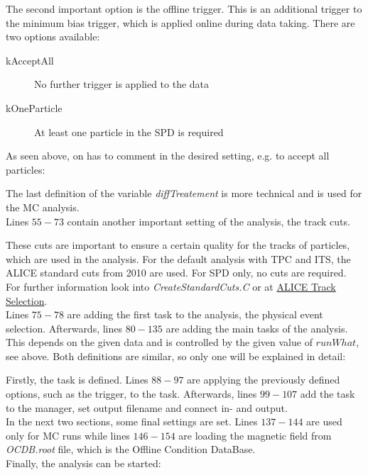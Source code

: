 \documentclass{article}
\begin{document}
The second important option is the offline trigger. This is an additional trigger to the minimum bias trigger, which is applied online during data taking. There are two options available:
\begin{description}
\item[kAcceptAll]{No further trigger is applied to the data}
\item[kOneParticle]{At least one particle in the SPD is required}
\end{description}
As seen above, on has to comment in the desired setting, e.g. to accept all particles:

The last definition of the variable \textit{diffTreatement} is more technical and is used for the MC analysis.\\
Lines $55-73$ contain another important setting of the analysis, the track cuts.

These cuts are important to ensure a certain quality for the tracks of particles, which are used in the analysis. For the default analysis with TPC and ITS, the ALICE standard cuts from 2010 are used. For SPD only, no cuts are required. For further information look into \textit{CreateStandardCuts.C} or at \href{https://twiki.cern.ch/twiki/bin/view/ALICE/SelectionOfPrimaryTracksForPpDataAnalysis}{ALICE Track Selection}.\\
Lines $75-78$ are adding the first task to the analysis, the physical event selection. Afterwards, lines $80-135$ are adding the main tasks of the analysis. This depends on the given data and is controlled by the given value of $runWhat$, see above. Both definitions are similar, so only one will be explained in detail:

Firstly, the task is defined. Lines $88-97$ are applying the previously defined options, such as the trigger, to the task. Afterwards, lines $99-107$ add the task to the manager, set output filename and connect in- and output.\\
In the next two sections, some final settings are set. Lines $137-144$ are used only for MC runs while lines $146-154$ are loading the magnetic field from \textit{OCDB.root} file, which is the Offline Condition DataBase.\\

Finally, the analysis can be started:

\end{document}
